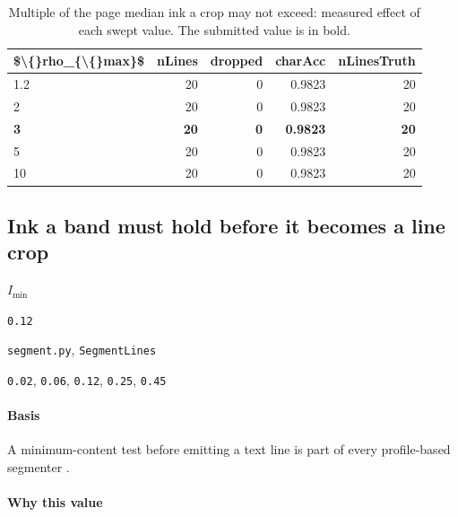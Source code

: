 \begin{table}[htbp]
\centering
\small
\caption{Multiple of the page median ink a crop may not exceed: measured effect of each swept value. The submitted value is in bold.}
\begin{tabular}{lrrrr}
\toprule
\$\textbackslash\{\}rho\_\{\textbackslash\{\}max\}\$ & \textsf{nLines} & \textsf{dropped} & \textsf{charAcc} & \textsf{nLinesTruth} \\
\midrule
1.2 & 20 & 0 & 0.9823 & 20 \\
2 & 20 & 0 & 0.9823 & 20 \\
\bfseries 3 & \bfseries 20 & \bfseries 0 & \bfseries 0.9823 & \bfseries 20 \\
5 & 20 & 0 & 0.9823 & 20 \\
10 & 20 & 0 & 0.9823 & 20 \\
\bottomrule
\end{tabular}
\end{table}

\subsection{Ink a band must hold before it becomes a line crop}

\label{coef:min-ink-frac}

\begin{description}[leftmargin=5.2em,style=sameline]

\item[Symbol] $I_{\min}$

\item[Value] \texttt{0.12}

\item[Source] \texttt{segment.py}, \texttt{SegmentLines}

\item[Swept] \texttt{0.02}, \texttt{0.06}, \texttt{0.12}, \texttt{0.25}, \texttt{0.45}

\end{description}

\paragraph{Basis}

A minimum-content test before emitting a text line is part of every profile-based segmenter \cite{likforman2007}.

\paragraph{Why this value}

